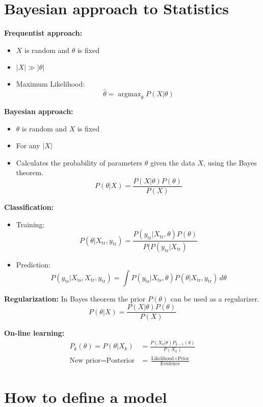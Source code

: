 \documentclass{book}
\DeclareMathOperator*{\argmax}{argmax}
\begin{document}
\section{Bayesian approach to Statistics}
\noindent
\textbf{Frequentist approach:}
\begin{itemize}
\item $X$ is random and $\theta$ is fixed 
\item $\vert X \vert \gg \vert \theta \vert$
\item Maximum Likelihood: \[\hat{\theta} = \argmax_{\theta} P(X \vert \theta)\]
\end{itemize}

\noindent
\textbf{Bayesian approach:}
\begin{itemize}
\item $\theta$ is random and $X$ is fixed
\item For any $\vert X \vert$
\item Calculates the probability of parameters $\theta$ given the data $X$, using the Bayes theorem.
\[ P(\theta \vert X) =  \frac{P(X \vert \theta)P(\theta)}{P(X)} \]
\end{itemize}

\noindent
\textbf{Classification:}
\begin{itemize}
\item Training: 
\[P(\theta \vert X_{\text{tr}}, y_{\text{tr}}) =  \frac{P(y_{\text{tr}} \vert X_{\text{tr}},\theta)P(\theta)}{P(P(y_{\text{tr}} \vert X_{\text{tr}})}\]
\item Prediction:
\[P(y_{\text{ts}} \vert X_{\text{ts}}, X_{\text{tr}}, y_{\text{tr}}) = \int P(y_{\text{ts}} \vert X_{\text{ts}}, \theta) P(\theta \vert X_{\text{tr}}, y_{\text{tr}}) \, d\theta\]
\end{itemize}

\noindent
\textbf{Regularization:}
In Bayes theorem the prior $P(\theta)$ can be used as a regularizer.
\[ P(\theta \vert X) =  \frac{P(X \vert \theta)P(\theta)}{P(X)} \]

\noindent
\textbf{On-line learning:}
\begin{align*} 
P_k(\theta) = P(\theta \vert X_k) &= \frac{P(X_k \vert \theta)P_{k-1}(\theta)}{P(X_k)} \\
\text{New prior} = \text{Posterior} &= \frac{\text{Likelihood} \times \text{Prior}}{\text{Evidence}}
\end{align*}

\section{How to define a model}
\end{document}
